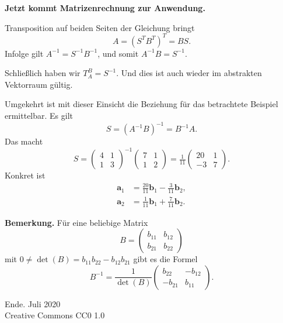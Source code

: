 \documentclass[9pt]{beamer}
\newcommand{\modest}[1]{{\small\color{gray}#1}}
\newcommand{\bv}[1]{\mathbf{#1}}
\newcommand{\strong}[1]{\textsf{\textbf{#1}}}
\begin{document}
\begin{frame}
\strong{Jetzt kommt Matrizenrechnung zur Anwendung.}\pause

\vspace{1em}
Transposition auf beiden Seiten der Gleichung bringt
\[A = (S^T B^T)^T = BS.\]\pause
Infolge gilt $A^{-1} = S^{-1} B^{-1}$, und somit
$A^{-1}B = S^{-1}.$\pause

\vspace{1em}
Schließlich haben wir $T_A^B=S^{-1}$. Und dies ist auch wieder
im abstrakten Vektorraum gültig.
\end{frame}

\begin{frame}
Umgekehrt ist mit dieser Einsicht die Beziehung für das betrachtete
Beispiel ermittelbar. Es gilt
\[S = (A^{-1}B)^{-1} = B^{-1}A.\]\pause
Das macht
\[S = \begin{pmatrix}4 & 1\\ 1 & 3\end{pmatrix}^{-1}
\begin{pmatrix}7 & 1\\ 1 & 2\end{pmatrix}
= \tfrac{1}{11}\begin{pmatrix}20 & 1\\ -3 & 7\end{pmatrix}.\]
Konkret ist
\begin{align*}
\bv a_1 &= \tfrac{20}{11}\bv b_1 - \tfrac{3}{11}\bv b_2,\\
\bv a_2 &= \tfrac{1}{11}\bv b_1 + \tfrac{7}{11}\bv b_2.
\end{align*}
\end{frame}

\begin{frame}
\strong{Bemerkung.} Für eine beliebige Matrix
\[B = \begin{pmatrix}b_{11} & b_{12}\\ b_{21} & b_{22}\end{pmatrix}\]
mit $0\ne \det(B) = b_{11}b_{22}-b_{12}b_{21}$ gibt es die Formel
\[B^{-1} = \frac{1}{\det(B)}\begin{pmatrix}
 b_{22} & -b_{12}\\
-b_{21} &  b_{11}
\end{pmatrix}.\]
\end{frame}

\begin{frame}
Ende.
\vfill\hfill\modest{Juli 2020}\\
\hfill\modest{Creative Commons CC0 1.0}
\end{frame}
\end{document}
